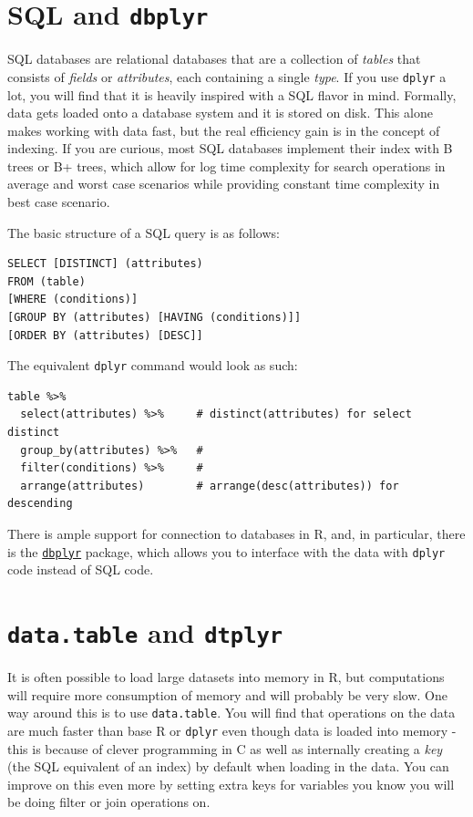 \documentclass[
]{book}
\begin{document}
\section{\texorpdfstring{SQL and \texttt{dbplyr}}{SQL and dbplyr}}\label{sql-and-dbplyr}

SQL databases are relational databases that are a collection of \emph{tables} that consists of \emph{fields} or \emph{attributes}, each containing a single \emph{type}. If you use \texttt{dplyr} a lot, you will find that it is heavily inspired with a SQL flavor in mind. Formally, data gets loaded onto a database system and it is stored on disk. This alone makes working with data fast, but the real efficiency gain is in the concept of indexing. If you are curious, most SQL databases implement their index with B trees or B+ trees, which allow for log time complexity for search operations in average and worst case scenarios while providing constant time complexity in best case scenario.

The basic structure of a SQL query is as follows:

\begin{verbatim}
SELECT [DISTINCT] (attributes)
FROM (table)
[WHERE (conditions)]
[GROUP BY (attributes) [HAVING (conditions)]]
[ORDER BY (attributes) [DESC]]
\end{verbatim}

The equivalent \texttt{dplyr} command would look as such:

\begin{verbatim}
table %>%
  select(attributes) %>%     # distinct(attributes) for select distinct
  group_by(attributes) %>%   # 
  filter(conditions) %>%     # 
  arrange(attributes)        # arrange(desc(attributes)) for descending
\end{verbatim}

There is ample support for connection to databases in R, and, in particular, there is the \href{https://dbplyr.tidyverse.org}{\texttt{dbplyr}} package, which allows you to interface with the data with \texttt{dplyr} code instead of SQL code.

\section{\texorpdfstring{\texttt{data.table} and \texttt{dtplyr}}{data.table and dtplyr}}\label{data.table-and-dtplyr}

It is often possible to load large datasets into memory in R, but computations will require more consumption of memory and will probably be very slow. One way around this is to use \texttt{data.table}. You will find that operations on the data are much faster than base R or \texttt{dplyr} even though data is loaded into memory - this is because of clever programming in C as well as internally creating a \emph{key} (the SQL equivalent of an index) by default when loading in the data. You can improve on this even more by setting extra keys for variables you know you will be doing filter or join operations on.
\end{document}
